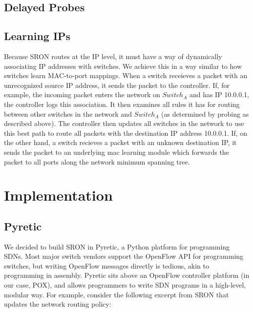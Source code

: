 \documentclass[pageno]{jpaper}
\begin{document}
\subsection{Delayed Probes}


\subsection{Learning IPs}
Because SRON routes at the IP level, it must have a way of dynamically associating IP addresses with switches.  We achieve this in a way similar to how switches learn MAC-to-port mappings.  When a switch receieves a packet with an unrecognized source IP address, it sends the packet to the controller.  If, for example, the incoming packet enters the network on $Switch_A$ and has IP 10.0.0.1, the controller logs this association.  It then examines all rules it has for routing between other switches in the network and $Switch_A$ (as determined by probing as described above).  The controller then updates all switches in the network to use this best path to route all packets with the destination IP address 10.0.0.1.  If, on the other hand, a switch recieves a packet with an unknown destination IP, it sends the packet to an underlying mac learning module which forwards the packet to all ports along the network minimum spanning tree.  


\section{Implementation}
\subsection{Pyretic}
	We decided to build SRON in Pyretic\cite{pyretic}, a Python platform for programming SDNs.  Most major switch vendors support the OpenFlow API for programming switches, but writing OpenFlow messages directly is tedious, akin to programming in assembly. Pyretic sits above an OpenFlow controller platform (in our case, POX\cite{pox}), and allows programmers to write SDN programs in a high-level, modular way.  For example, consider the following excerpt from SRON that updates the network routing policy:\bigskip



\end{document}
